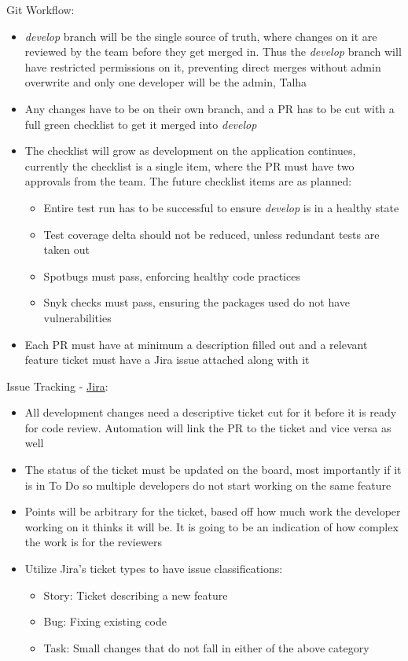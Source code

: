 \documentclass{article}
\begin{document}
Git Workflow: 
\begin{itemize}
	\item \emph{develop} branch will be the single source of truth, where changes on it are reviewed by the team before they get merged in. Thus the \emph{develop} branch will have restricted permissions on it, preventing direct merges without admin overwrite and only one developer will be the admin, Talha
	\item Any changes have to be on their own branch, and a PR has to be cut with a full green checklist to get it merged into \emph{develop}
	\item The checklist will grow as development on the application continues, currently the checklist is a single item, where the PR must have two approvals from the team. The future checklist items are as planned:
	\begin{itemize}
		\item Entire test run has to be successful to ensure \emph{develop} is in a healthy state
		\item Test coverage delta should not be reduced, unless redundant tests are taken out
		\item Spotbugs must pass, enforcing healthy code practices
		\item Snyk checks must pass, ensuring the packages used do not have vulnerabilities
	\end{itemize}
	\item Each PR must have at minimum a description filled out and a relevant feature ticket must have a Jira issue attached along with it
\end{itemize}

Issue Tracking - \href{https://flickpicker.atlassian.net/jira/software/projects/CAP/boards/1}{Jira}: 
\begin{itemize}
	\item All development changes need a descriptive ticket cut for it before it is ready for code review. Automation will link the PR to the ticket and vice versa as well
	\item The status of the ticket must be updated on the board, most importantly if it is in To Do so multiple developers do not start working on the same feature
	\item Points will be arbitrary for the ticket, based off how much work the developer working on it thinks it will be. It is going to be an indication of how complex the work is for the reviewers
	\item Utilize Jira's ticket types to have issue classifications:
	\begin{itemize}
		\item Story: Ticket describing a new feature
		\item Bug: Fixing existing code
		\item Task: Small changes that do not fall in either of the above category
	\end{itemize}
\end{itemize}
\end{document}
